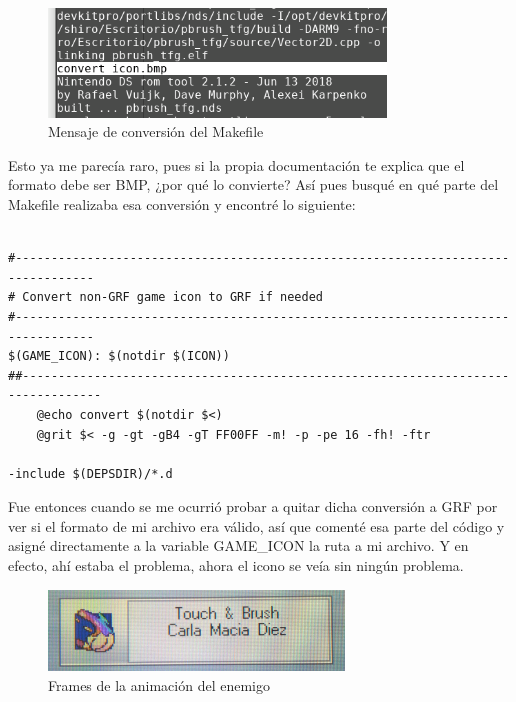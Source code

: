 \clearpage

\begin{figure}[htbp]
\centering
  \includegraphics[width=0.8\textwidth]{archivos/convert_grf.png}
  \caption{Mensaje de conversión del Makefile}
  \label{fig:convert_grf}
\end{figure}

 \vspace{0.5cm}

Esto ya me parecía raro, pues si la propia documentación te explica que el formato debe ser BMP, ¿por qué lo convierte? Así pues busqué en qué parte del Makefile realizaba esa conversión y encontré lo siguiente:

 \vspace{0.5cm}

   \begin{lstlisting}[caption={Conversión del archivo BMP a GRF en el Makefile}, label={code:bmptogrfmakefile}]

#---------------------------------------------------------------------------------
# Convert non-GRF game icon to GRF if needed
#---------------------------------------------------------------------------------
$(GAME_ICON): $(notdir $(ICON))
##---------------------------------------------------------------------------------
	@echo convert $(notdir $<)
	@grit $< -g -gt -gB4 -gT FF00FF -m! -p -pe 16 -fh! -ftr

-include $(DEPSDIR)/*.d

\end{lstlisting}

 \vspace{0.5cm}

Fue entonces cuando se me ocurrió probar a quitar dicha conversión a GRF por ver si el formato de mi archivo era válido, así que comenté esa parte del código y asigné directamente a la variable GAME\_ICON la ruta a mi archivo. Y en efecto, ahí estaba el problema, ahora el icono se veía sin ningún problema.

 \vspace{0.5cm}

\begin{figure}[htbp]
\centering
  \includegraphics[width=0.7\textwidth]{archivos/icon_good.jpg}
  \caption{Frames de la animación del enemigo}
  \label{fig:icon_good}
\end{figure}

